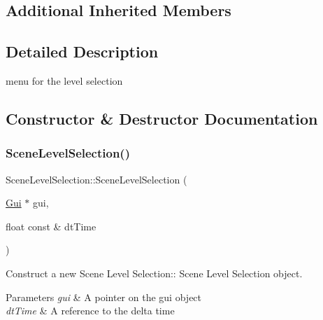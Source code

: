 \subsection*{Additional Inherited Members}


\subsection{Detailed Description}
menu for the level selection 

\subsection{Constructor \& Destructor Documentation}
\mbox{\label{class_scene_level_selection_ae855a833994439a9f780a0da59dbd3f2}} 
\subsubsection{\texorpdfstring{Scene\+Level\+Selection()}{SceneLevelSelection()}\hspace{0.1cm}{\footnotesize\ttfamily [1/2]}}
{\footnotesize\ttfamily Scene\+Level\+Selection\+::\+Scene\+Level\+Selection (\begin{DoxyParamCaption}\item[{\hyperlink{class_gui}{Gui} $\ast$}]{gui,  }\item[{float const \&}]{dt\+Time }\end{DoxyParamCaption})\hspace{0.3cm}{\ttfamily [explicit]}}



Construct a new Scene Level Selection\+:\+: Scene Level Selection object. 


\begin{DoxyParams}{Parameters}
{\em gui} & A pointer on the gui object \\
\hline
{\em dt\+Time} & A reference to the delta time \\
\hline
\end{DoxyParams}
\mbox{\label{class_scene_level_selection_a209ae1ee5432204a65842783208498e3}} 
